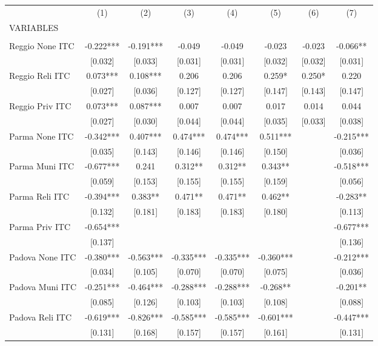 \begin{tabular}{lccccccc} \hline
 & (1) & (2) & (3) & (4) & (5) & (6) & (7) \\
VARIABLES &  &  &  &  &  &  &  \\ \hline
 &  &  &  &  &  &  &  \\
Reggio None ITC & -0.222*** & -0.191*** & -0.049 & -0.049 & -0.023 & -0.023 & -0.066** \\
 & [0.032] & [0.033] & [0.031] & [0.031] & [0.032] & [0.032] & [0.031] \\
Reggio Reli ITC & 0.073*** & 0.108*** & 0.206 & 0.206 & 0.259* & 0.250* & 0.220 \\
 & [0.027] & [0.036] & [0.127] & [0.127] & [0.147] & [0.143] & [0.147] \\
Reggio Priv ITC & 0.073*** & 0.087*** & 0.007 & 0.007 & 0.017 & 0.014 & 0.044 \\
 & [0.027] & [0.030] & [0.044] & [0.044] & [0.035] & [0.033] & [0.038] \\
Parma None ITC & -0.342*** & 0.407*** & 0.474*** & 0.474*** & 0.511*** &  & -0.215*** \\
 & [0.035] & [0.143] & [0.146] & [0.146] & [0.150] &  & [0.036] \\
Parma Muni ITC & -0.677*** & 0.241 & 0.312** & 0.312** & 0.343** &  & -0.518*** \\
 & [0.059] & [0.153] & [0.155] & [0.155] & [0.159] &  & [0.056] \\
Parma Reli ITC & -0.394*** & 0.383** & 0.471** & 0.471** & 0.462** &  & -0.283** \\
 & [0.132] & [0.181] & [0.183] & [0.183] & [0.180] &  & [0.113] \\
Parma Priv ITC & -0.654*** &  &  &  &  &  & -0.677*** \\
 & [0.137] &  &  &  &  &  & [0.136] \\
Padova None ITC & -0.380*** & -0.563*** & -0.335*** & -0.335*** & -0.360*** &  & -0.212*** \\
 & [0.034] & [0.105] & [0.070] & [0.070] & [0.075] &  & [0.036] \\
Padova Muni ITC & -0.251*** & -0.464*** & -0.288*** & -0.288*** & -0.268** &  & -0.201** \\
 & [0.085] & [0.126] & [0.103] & [0.103] & [0.108] &  & [0.088] \\
Padova Reli ITC & -0.619*** & -0.826*** & -0.585*** & -0.585*** & -0.601*** &  & -0.447*** \\
 & [0.131] & [0.168] & [0.157] & [0.157] & [0.161] &  & [0.131] \\

\end{tabular}
